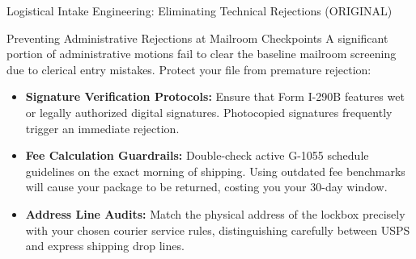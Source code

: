 \documentclass[11pt]{beamer}
\begin{document}
	\begin{frame}{Logistical Intake Engineering: Eliminating Technical Rejections (ORIGINAL)}
		\scriptsize
		\begin{block}{Preventing Administrative Rejections at Mailroom Checkpoints}
			A significant portion of administrative motions fail to clear the baseline mailroom screening due to clerical entry mistakes. Protect your file from premature rejection:
			\begin{itemize}
				\item \textbf{Signature Verification Protocols:} Ensure that Form I-290B features wet or legally authorized digital signatures. Photocopied signatures frequently trigger an immediate rejection.
				\item \textbf{Fee Calculation Guardrails:} Double-check active G-1055 schedule guidelines on the exact morning of shipping. Using outdated fee benchmarks will cause your package to be returned, costing you your 30-day window.
				\item \textbf{Address Line Audits:} Match the physical address of the lockbox precisely with your chosen courier service rules, distinguishing carefully between USPS and express shipping drop lines.
			\end{itemize}
		\end{block}
	\end{frame}
	
	
\end{document}
